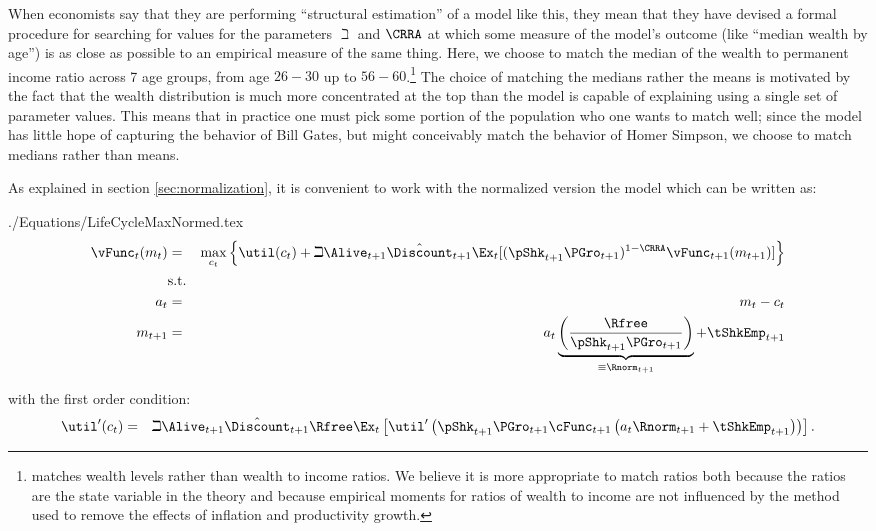 \documentclass[titlepage]{\econtex}
\begin{document}
  When economists say that they are performing ``structural estimation''
  of a model like this, they mean that they have devised a
  formal procedure for searching for values for the parameters ${\beth}$
  and $\CRRA$ at which some measure of the model's outcome (like
  ``median wealth by age'') is as close as possible to an empirical measure
  of the same thing. Here, we choose to match the median of the
  wealth to permanent income ratio across 7 age groups, from age $26-30$
  up to $56-60$.\footnote{\cite{cagettiWprofiles}
    matches wealth levels rather than wealth to income ratios. We
    believe it is more appropriate to match ratios both because the
    ratios are the state variable in the theory and because empirical
    moments for ratios of wealth to income are not influenced by the
    method used to remove the effects of inflation and productivity
    growth.} The choice of matching the medians rather the means is
  motivated by the fact that the wealth distribution is much more
  concentrated at the top than the model is capable of explaining using a single
  set of parameter values.  This means that in practice one must pick
  some portion of the population who one wants to match well; since the
  model has little hope of capturing the behavior of Bill Gates, but
  might conceivably match the behavior of Homer Simpson, we choose to
  match medians rather than means.

  As explained in section \ref{sec:normalization}, it is convenient to work with the normalized version the model which can be written as:
  \begin{verbatimwrite}{./Equations/LifeCycleMaxNormed.tex}
    \begin{eqnarray*}
      {\vFunc}_{t}({m}_{t}) & = & \max_{{c}_{t}} \left\{\util({c}_{t})+\beth\Alive_{t+1}\hat{\Discount}_{t+1}
                                  \Ex_{t}[(\pShk_{t+1}\PGro_{t+1})^{1-\CRRA}{\vFunc}_{t+1}({m}_{t+1})] \right\}   \\
                            & \text{s.t.} &   \nonumber \\
      {a}_{t}   & = & {m}_{t}-{c}_{t} \nonumber
      \\      {m}_{t+1} & = & {a}_{t}\underbrace{\left(\frac{\Rfree}{\pShk_{t+1}\PGro_{t+1}}\right)}_{\equiv \Rnorm_{t+1}}+\tShkEmp_{t+1}
    \end{eqnarray*}
  \end{verbatimwrite}
  
  with the first order condition:
  \begin{eqnarray}
    \util^{\prime}({c}_{t})&=&\beth\Alive_{t+1}\hat{\Discount}_{t+1}\Rfree \Ex_{t}\left[\util^{\prime}\left(\pShk_{t+1}\PGro_{t+1}\cFunc_{t+1}\left({a}_{t}\Rnorm_{t+1}+\tShkEmp_{t+1}\right)\right)\right]\label{eq:FOCLifeCycle}
                               .
  \end{eqnarray}
\end{document}
